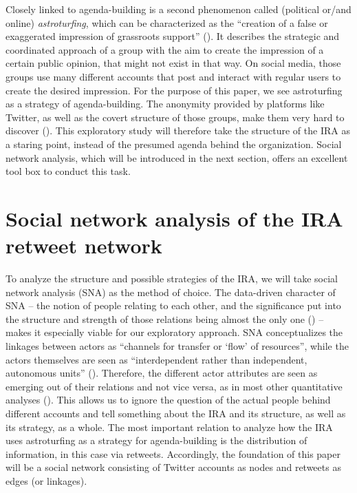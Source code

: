 \documentclass[12pt, titlepage=true, toc=bib]{scrartcl}
\begin{document}
Closely linked to agenda-building is a second phenomenon called (political or/and online) \textit{astroturfing}, which can be characterized as the ``creation of a false or exaggerated impression of grassroots support'' (\cite{harcup_astroturfing_2014}). It describes the strategic and coordinated approach of a group with the aim to create the impression of a certain public opinion, that might not exist in that way. On social media, those groups use many different accounts that post and interact with regular users to create the desired impression. For the purpose of this paper, we see astroturfing as a strategy of agenda-building. The anonymity provided by platforms like Twitter, as well as the covert structure of those groups, make them very hard to discover (\cite[564]{yang_how_2017}). This exploratory study will therefore take the structure of the IRA as a staring point, instead of the presumed agenda behind the organization. Social network analysis, which will be introduced in the next section, offers an excellent tool box to conduct this task.


\section{Social network analysis of the IRA retweet network}

To analyze the structure and possible strategies of the IRA, we will take social network analysis (SNA) as the method of choice. The data-driven character of SNA -- the notion of people relating to each other, and the significance put into the structure and strength of those relations being almost the only one (\cite[982]{golovchenko_state_2018}) -- makes it especially viable for our exploratory approach. SNA conceptualizes the linkages between actors as \enquote{channels for transfer or \enquote{flow} of resources}, while the actors themselves are seen as ``interdependent rather than independent, autonomous units'' (\cite[4]{wasserman_social_1994}). Therefore, the different actor attributes are seen as emerging out of their relations and not vice versa, as in most other quantitative analyses (\cite[8]{wasserman_social_1994}). This allows us to ignore the question of the actual people behind different accounts and tell something about the IRA and its structure, as well as its strategy, as a whole. The most important relation to analyze how the IRA uses astroturfing as a strategy for agenda-building is the distribution of information, in this case via retweets. Accordingly, the foundation of this paper will be a social network consisting of Twitter accounts as nodes and retweets as edges (or linkages).
\end{document}
